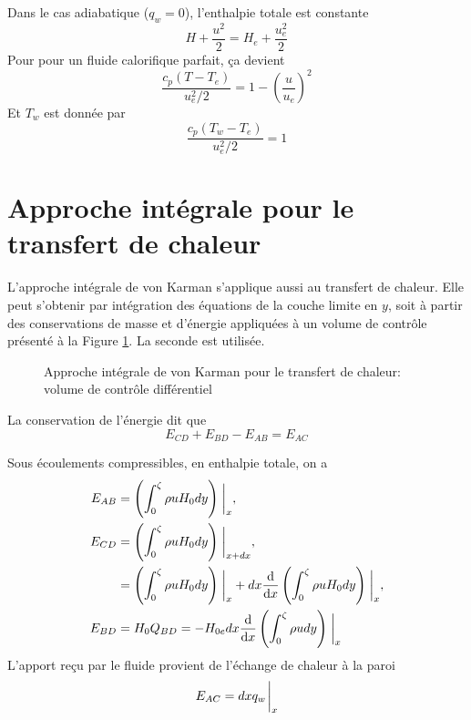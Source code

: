       Dans le cas adiabatique ($q_w = 0$), l'enthalpie totale est constante
      \begin{equation}
        H + \frac{u^2}{2} = H_e + \frac{u_e^2}{2}
      \end{equation}
      Pour pour un fluide calorifique parfait, ça devient
      \begin{equation}
        \frac{c_p(T-T_e)}{u_e^2/2} = 1 - \left(\frac{u}{u_e}\right)^2
      \end{equation}
      Et $T_w$ est donnée par
      \begin{equation}
        \frac{c_p(T_w - T_e)}{u_e^2 /2} = 1
      \end{equation}

  \section{Approche intégrale pour le transfert de chaleur}
    L'approche intégrale de von Karman s'applique aussi au transfert de chaleur. Elle peut s'obtenir par intégration des équations de la couche limite en $y$, soit à partir des conservations de masse et d'énergie appliquées à un volume de contrôle présenté à la Figure \ref{fig:vonKarman}. La seconde est utilisée.

    \begin{figure}[!h]
      \centering
      
      \caption{Approche intégrale de von Karman pour le transfert de chaleur: volume de contrôle différentiel}
      \label{fig:vonKarman}
    \end{figure}

    La conservation de l'énergie dit que
    \begin{equation}
      E_{CD} + E_{BD} - E_{AB} = E_{AC}
    \end{equation}

    Sous écoulements compressibles, en enthalpie totale, on a
    \begin{equation}
      \begin{aligned}
        E_{AB} &= \left(\int_0^\zeta \rho u H_0 dy\right)\eval_x,\\
        E_{CD} &= \left(\int_0^\zeta \rho u H_0 dy\right)\eval_{x+dx},\\
        &= \left(\int_0^\zeta \rho u H_0 dy\right)\eval_x + dx \dv{x}\left(\int_0^\zeta \rho u H_0 dy\right)\eval_x,\\
        E_{BD} &= H_0 Q_{BD} = -H_{0e} dx \dv{x}\left(\int_0^\zeta \rho u dy \right)\eval_x
      \end{aligned}
    \end{equation}
    L'apport reçu par le fluide provient de l'échange de chaleur à la paroi
    \begin{equation}
      E_{AC} = dx q_w \eval_x
    \end{equation}

